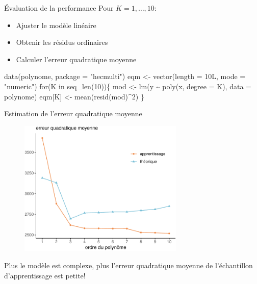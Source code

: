 \documentclass[
  ignorenonframetext,
]{beamer}
\newenvironment{Shaded}{\begin{snugshade}}{\end{snugshade}}
\newcommand{\AttributeTok}[1]{\textcolor[rgb]{0.40,0.45,0.13}{#1}}
\newcommand{\ControlFlowTok}[1]{\textcolor[rgb]{0.00,0.23,0.31}{#1}}
\newcommand{\DecValTok}[1]{\textcolor[rgb]{0.68,0.00,0.00}{#1}}
\newcommand{\FunctionTok}[1]{\textcolor[rgb]{0.28,0.35,0.67}{#1}}
\newcommand{\NormalTok}[1]{\textcolor[rgb]{0.00,0.23,0.31}{#1}}
\newcommand{\OtherTok}[1]{\textcolor[rgb]{0.00,0.23,0.31}{#1}}
\newcommand{\SpecialCharTok}[1]{\textcolor[rgb]{0.37,0.37,0.37}{#1}}
\newcommand{\StringTok}[1]{\textcolor[rgb]{0.13,0.47,0.30}{#1}}
\providecommand{\tightlist}{%
  \setlength{\itemsep}{0pt}\setlength{\parskip}{0pt}}\usepackage{longtable,booktabs,array}
\begin{document}
\begin{frame}[fragile]{Évaluation de la performance}
\protect\hypertarget{uxe9valuation-de-la-performance}{}
Pour \(K=1, \ldots, 10\):

\begin{itemize}
\tightlist
\item
  Ajuster le modèle linéaire
\item
  Obtenir les résidus ordinaires
\item
  Calculer l'erreur quadratique moyenne
\end{itemize}

\begin{Shaded}
\begin{Highlighting}[numbers=left,,]
\FunctionTok{data}\NormalTok{(polynome, }\AttributeTok{package =} \StringTok{"hecmulti"}\NormalTok{)}
\NormalTok{eqm }\OtherTok{\textless{}{-}} \FunctionTok{vector}\NormalTok{(}\AttributeTok{length =}\NormalTok{ 10L, }\AttributeTok{mode =} \StringTok{"numeric"}\NormalTok{)}
\ControlFlowTok{for}\NormalTok{(K }\ControlFlowTok{in} \FunctionTok{seq\_len}\NormalTok{(}\DecValTok{10}\NormalTok{))\{}
\NormalTok{ mod }\OtherTok{\textless{}{-}} \FunctionTok{lm}\NormalTok{(y }\SpecialCharTok{\textasciitilde{}} \FunctionTok{poly}\NormalTok{(x, }\AttributeTok{degree =}\NormalTok{ K), }\AttributeTok{data =}\NormalTok{ polynome)}
\NormalTok{ eqm[K] }\OtherTok{\textless{}{-}} \FunctionTok{mean}\NormalTok{(}\FunctionTok{resid}\NormalTok{(mod)}\SpecialCharTok{\^{}}\DecValTok{2}\NormalTok{)}
\NormalTok{\}}
\end{Highlighting}
\end{Shaded}
\end{frame}

\begin{frame}{Estimation de l'erreur quadratique moyenne}
\protect\hypertarget{estimation-de-lerreur-quadratique-moyenne}{}
\begin{figure}

{\centering \includegraphics[width=0.7\textwidth,height=\textheight]{MATH60602-diapos4_files/figure-beamer/unnamed-chunk-8-1.pdf}

}

\end{figure}

Plus le modèle est complexe, plus l'erreur quadratique moyenne de
l'échantillon d'apprentissage est petite!
\end{frame}
\end{document}
